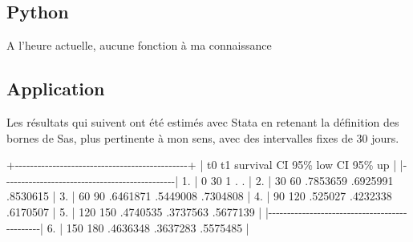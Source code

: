 \documentclass[
  12pt,
  letterpaper,
  DIV=11,
  numbers=noendperiod,
  onepage,
  openany]{scrreprt}
\newenvironment{Shaded}{\begin{snugshade}}{\end{snugshade}}
\newcommand{\DecValTok}[1]{\textcolor[rgb]{0.86,0.86,0.80}{#1}}
\newcommand{\ErrorTok}[1]{\textcolor[rgb]{0.76,0.75,0.62}{#1}}
\newcommand{\FloatTok}[1]{\textcolor[rgb]{0.75,0.75,0.82}{#1}}
\newcommand{\NormalTok}[1]{\textcolor[rgb]{0.80,0.80,0.80}{#1}}
\newcommand{\SpecialCharTok}[1]{\textcolor[rgb]{0.86,0.64,0.64}{#1}}
\begin{document}
\subsection{Python}

A l'heure actuelle, aucune fonction à ma connaissance

\hypertarget{application}{%
\subsection{Application}\label{application}}

Les résultats qui suivent ont été estimés avec Stata en retenant la
définition des bornes de Sas, plus pertinente à mon sens, avec des
intervalles fixes de 30 jours.

\begin{Shaded}
\begin{Highlighting}[]
     \SpecialCharTok{+{-}{-}{-}{-}{-}{-}{-}{-}{-}{-}{-}{-}{-}{-}{-}{-}{-}{-}{-}{-}{-}{-}{-}{-}{-}{-}{-}{-}{-}{-}{-}{-}{-}{-}{-}{-}{-}{-}{-}{-}{-}{-}{-}{-}{-}{-}+}
     \ErrorTok{|}\NormalTok{   t0     t1   survival CI }\DecValTok{95}\SpecialCharTok{\% low  CI 95\%}\NormalTok{ up }\SpecialCharTok{|}
     \ErrorTok{|}\SpecialCharTok{{-}{-}{-}{-}{-}{-}{-}{-}{-}{-}{-}{-}{-}{-}{-}{-}{-}{-}{-}{-}{-}{-}{-}{-}{-}{-}{-}{-}{-}{-}{-}{-}{-}{-}{-}{-}{-}{-}{-}{-}{-}{-}{-}{-}{-}{-}}\ErrorTok{|}
  \FloatTok{1.} \SpecialCharTok{|}    \DecValTok{0}     \DecValTok{30}          \DecValTok{1}\NormalTok{          .          . }\SpecialCharTok{|}
  \FloatTok{2.} \SpecialCharTok{|}   \DecValTok{30}     \DecValTok{60}\NormalTok{   .}\DecValTok{7853659}\NormalTok{   .}\DecValTok{6925991}\NormalTok{   .}\DecValTok{8530615} \SpecialCharTok{|}
  \FloatTok{3.} \SpecialCharTok{|}   \DecValTok{60}     \DecValTok{90}\NormalTok{   .}\DecValTok{6461871}\NormalTok{   .}\DecValTok{5449008}\NormalTok{   .}\DecValTok{7304808} \SpecialCharTok{|}
  \FloatTok{4.} \SpecialCharTok{|}   \DecValTok{90}    \DecValTok{120}\NormalTok{    .}\DecValTok{525027}\NormalTok{   .}\DecValTok{4232338}\NormalTok{   .}\DecValTok{6170507} \SpecialCharTok{|}
  \FloatTok{5.} \SpecialCharTok{|}  \DecValTok{120}    \DecValTok{150}\NormalTok{   .}\DecValTok{4740535}\NormalTok{   .}\DecValTok{3737563}\NormalTok{   .}\DecValTok{5677139} \SpecialCharTok{|}
     \ErrorTok{|}\SpecialCharTok{{-}{-}{-}{-}{-}{-}{-}{-}{-}{-}{-}{-}{-}{-}{-}{-}{-}{-}{-}{-}{-}{-}{-}{-}{-}{-}{-}{-}{-}{-}{-}{-}{-}{-}{-}{-}{-}{-}{-}{-}{-}{-}{-}{-}{-}{-}}\ErrorTok{|}
  \FloatTok{6.} \SpecialCharTok{|}  \DecValTok{150}    \DecValTok{180}\NormalTok{   .}\DecValTok{4636348}\NormalTok{   .}\DecValTok{3637283}\NormalTok{   .}\DecValTok{5575485} \SpecialCharTok{|}

\end{Highlighting}
\end{Shaded}
\end{document}
